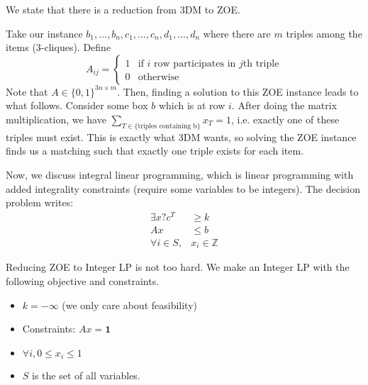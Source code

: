 We state that there is a reduction from 3DM to ZOE.
\begin{algothm}
    Take our instance $b_1, \dots, b_n, c_1, \dots, c_n, d_1, \dots, d_n$ where there are $m$ triples among the items (3-cliques). Define
    \[ A_{ij} = \begin{cases}
        1 & \text{if $i$ row participates in $j$th triple} \\
        0 & \text{otherwise}
    \end{cases}\]
    Note that $A \in \{0,1\}^{3n \times m}$. Then, finding a solution to this ZOE instance leads to what follows. Consider some box $b$ which is at row $i$. After doing the matrix multiplication,
    we have $\sum_{T \in \{\text{triples containing b}\}} x_T = 1$, i.e. exactly one of these triples must exist. This is exactly what 3DM wants, so solving the ZOE instance
    finds us a matching such that exactly one triple exists for each item.
\end{algothm}

Now, we discuss integral linear programming, which is linear programming with added integrality constraints (require some variables to be integers).
The decision problem writes:
\begin{align*}
    \exists x? c^T &\geq k \\
    Ax &\leq b \\
    \forall i \in S, &x_i \in \mathbb{Z}
\end{align*}

Reducing ZOE to Integer LP is not too hard. We make an Integer LP with the following objective and constraints.
\begin{itemize}
    \item $k = -\infty$ (we only care about feasibility)
    \item Constraints: $Ax = \textbf{1}$
    \item $\forall i, 0 \leq x_i \leq 1$
    \item $S$ is the set of all variables.
\end{itemize}